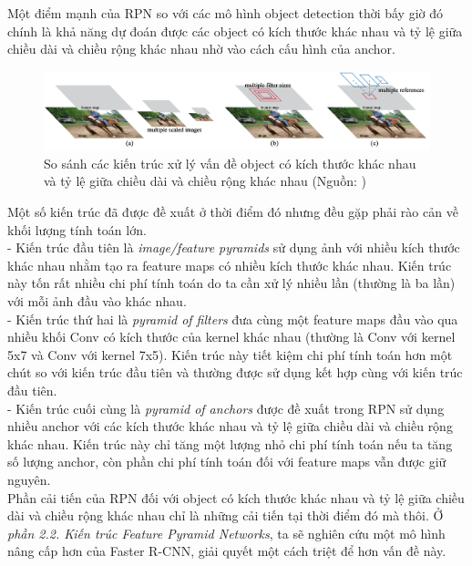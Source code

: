 {    \noindent
    Một điểm mạnh của RPN so với các mô hình object detection thời bấy giờ đó chính là khả năng dự đoán được các object có kích thước khác nhau và tỷ lệ giữa chiều dài và chiều rộng khác nhau nhờ vào cách cấu hình của anchor.

    \begin{figure}[H]
        \centering
        \includegraphics[width=15cm] {images/faster_rcnn_multi_scale_anchor}
        \caption{So sánh các kiến trúc xử lý vấn đề object có kích thước khác nhau và tỷ lệ giữa chiều dài và chiều rộng khác nhau (Nguồn: \cite{ren2015faster})}
        \label{fig:faster_rcnn_multi_scale_anchor}
    \end{figure}

    \noindent
    Một số kiến trúc đã được đề xuất ở thời điểm đó nhưng đều gặp phải rào cản về khối lượng tính toán lớn. \\
    - Kiến trúc đầu tiên là \textit{image/feature pyramids} sử dụng ảnh với nhiều kích thước khác nhau nhằm tạo ra feature maps có nhiều kích thước khác nhau.
    Kiến trúc này tốn rất nhiều chi phí tính toán do ta cần xử lý nhiều lần (thường là ba lần) với mỗi ảnh đầu vào khác nhau. \\
    - Kiến trúc thứ hai là \textit{pyramid of filters} đưa cùng một feature maps đầu vào qua nhiều khối Conv có kích thước của kernel khác nhau (thường là Conv với kernel 5x7 và Conv với kernel 7x5).
    Kiến trúc này tiết kiệm chi phí tính toán hơn một chút so với kiến trúc đầu tiên và thường được sử dụng kết hợp cùng với kiến trúc đầu tiên. \\
    - Kiến trúc cuối cùng là \textit{pyramid of anchors} được đề xuất trong RPN sử dụng nhiều anchor với các kích thước khác nhau và tỷ lệ giữa chiều dài và chiều rộng khác nhau.
    Kiến trúc này chỉ tăng một lượng nhỏ chi phí tính toán nếu ta tăng số lượng anchor, còn phần chi phí tính toán đối với feature maps vẫn được giữ nguyên. \\
    Phần cải tiến của RPN đối với object có kích thước khác nhau và tỷ lệ giữa chiều dài và chiều rộng khác nhau chỉ là những cải tiến tại thời điểm đó mà thôi.
    Ở \textit{phần 2.2. Kiến trúc Feature Pyramid Networks}, ta sẽ nghiên cứu một mô hình nâng cấp hơn của Faster R-CNN, giải quyết một cách triệt để hơn vấn đề này.

}
